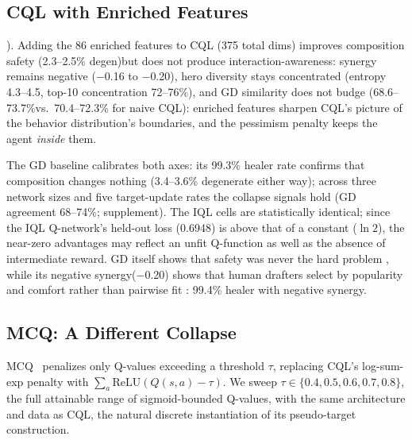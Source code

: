 \documentclass[journal]{IEEEtran}
\providecommand{\DIFaddtex}[1]{{\protect\color{blue} \sf #1}} %
\providecommand{\DIFdeltex}[1]{{\protect\color{red} \scriptsize #1}} %
\providecommand{\DIFaddbegin}{} %
\providecommand{\DIFaddend}{} %
\providecommand{\DIFdelbegin}{} %
\providecommand{\DIFdelend}{} %
\providecommand{\DIFadd}[1]{\texorpdfstring{\DIFaddtex{#1}}{#1}} %
\providecommand{\DIFdel}[1]{\texorpdfstring{\DIFdeltex{#1}}{}} %
\begin{document}
\subsection{\DIFdel{CQL with Enriched Features}}
\addtocounter{subsection}{-1}%

\DIFdelend \DIFaddbegin \DIFadd{0.86). }\DIFaddend Adding the 86 enriched features to CQL \DIFdelbegin \DIFdel{(375 total dims) improves composition safety (2.3--2.5\% degen)but does not produce interaction-awareness: synergy remains negative ($-$0.16 to $-$0.20), hero diversity stays concentrated (entropy 4.3--4.5, top-10 concentration 72--76\%), and GD similarity does not budge (68.6--73.7\%vs.\ 70.4--72.3\% for naive CQL): enriched features sharpen CQL's picture of the behavior distribution's boundaries, and the pessimism penalty keeps the agent \textit{inside} them. }%

\DIFdel{The GD baseline calibrates both axes: its 99.3\% healer rate confirms that composition }\DIFdelend \DIFaddbegin \DIFadd{changes nothing (3.4--3.6\% degenerate either way); across three network sizes and five target-update rates the collapse signals hold (GD agreement 68--74\%; supplement). The IQL cells are statistically identical; since the IQL Q-network's held-out loss (0.6948) is above that of a constant ($\ln 2$), the near-zero advantages may reflect an unfit Q-function as well as the absence of intermediate reward. GD itself shows that }\DIFaddend safety was never the hard problem\DIFdelbegin \DIFdel{, while its negative synergy($-$0.20) shows that human drafters select by popularity and comfort rather than pairwise fit}\DIFdelend \DIFaddbegin \DIFadd{: 99.4\% healer with negative synergy}\DIFaddend .

\DIFdelbegin \subsection{\DIFdel{MCQ: A Different Collapse}}
\addtocounter{subsection}{-1}%

\DIFdel{MCQ~\cite{lyu2022mildly} penalizes only Q-values exceeding a threshold $\tau$, replacing CQL's log-sum-exp penalty with \mbox{$\sum_a \mathrm{ReLU}(Q(s,a) - \tau)$}. We sweep $\tau \in \{0.4, 0.5, 0.6, 0.7, 0.8\}$, the full attainable range of sigmoid-bounded Q-values, with the same architecture and data as CQL, the natural discrete instantiation of its pseudo-target construction.
}%
\end{document}
